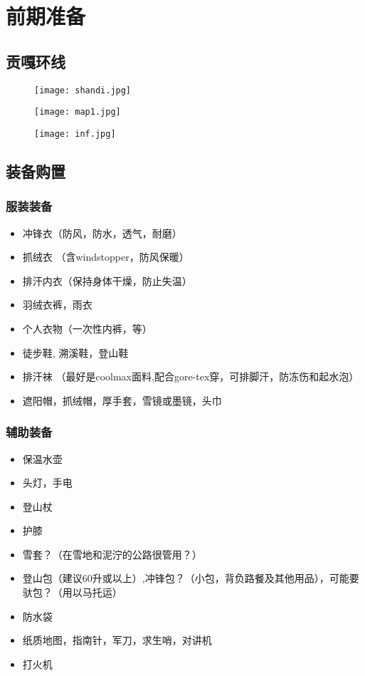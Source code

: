 \section{前期准备}
\subsection{贡嘎环线}

\begin{figure}[htbp]
  \texttt{[image: shandi.jpg]}
\end{figure}
\begin{figure}[htbp]
  \texttt{[image: map1.jpg]}
\end{figure}
\begin{figure}[htbp]
  \texttt{[image: inf.jpg]}
\end{figure}

\subsection{装备购置}
\subsubsection{服装装备}
\begin{itemize}
  \item 冲锋衣（防风，防水，透气，耐磨）
  \item 抓绒衣 （含windstopper，防风保暖）
  \item 排汗内衣（保持身体干燥，防止失温）
  \item 羽绒衣裤，雨衣
  \item 个人衣物（一次性内裤，等）
  \item 徒步鞋, 溯溪鞋，登山鞋
  \item 排汗袜 （最好是coolmax面料,配合gore-tex穿，可排脚汗，防冻伤和起水泡）
  \item 遮阳帽，抓绒帽，厚手套，雪镜或墨镜，头巾
\end{itemize}
\subsubsection{辅助装备}
\begin{itemize}
  \item 保温水壶
  \item 头灯，手电
  \item 登山杖
  \item 护膝
  \item 雪套？（在雪地和泥泞的公路很管用？）
  \item 登山包（建议60升或以上）,冲锋包？（小包，背负路餐及其他用品），可能要驮包？（用以马托运）
  \item 防水袋
  \item 纸质地图，指南针，军刀，求生哨，对讲机
  \item 打火机
\end{itemize}
